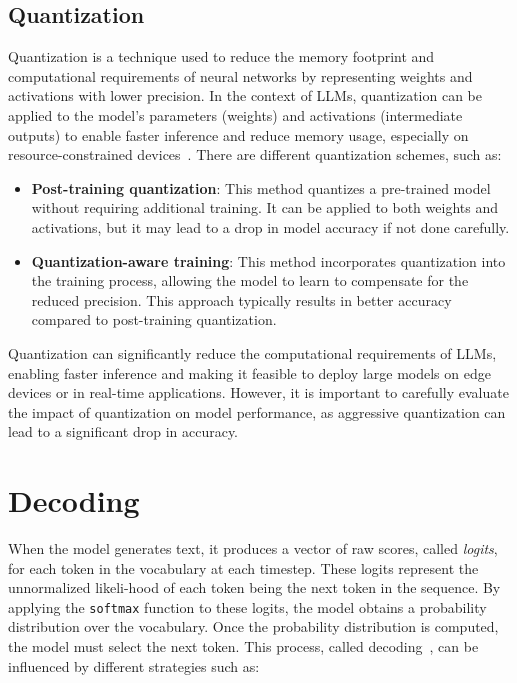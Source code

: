 \subsection{Quantization}
Quantization is a technique used to reduce the memory footprint and computational requirements of neural networks by representing weights and activations with lower precision.
In the context of \ac{LLM}s, quantization can be applied to the model's parameters (weights) and activations (intermediate outputs) to enable faster inference and reduce memory usage, especially on resource-constrained devices~\cite{site:WhatQuantization,site:huggingfaceQuantization}.
There are different quantization schemes, such as:
\begin{itemize}
    \item \textbf{Post-training quantization}: This method quantizes a pre-trained model without requiring additional training. It can be applied to both weights and activations, but it may lead to a drop in model accuracy if not done carefully.
    \item \textbf{Quantization-aware training}: This method incorporates quantization into the training process, allowing the model to learn to compensate for the reduced precision. This approach typically results in better accuracy compared to post-training quantization.    
    \end{itemize}
Quantization can significantly reduce the computational requirements of \ac{LLM}s, enabling faster inference and making it feasible to deploy large models on edge devices or in real-time applications. However, it is important to carefully evaluate the impact of quantization on model performance, as aggressive quantization can lead to a significant drop in accuracy.

\section{Decoding}
When the model generates text, it produces a vector of raw scores, called \emph{logits}, for each
token in the vocabulary at each timestep. These logits represent the unnormalized likeli-hood of each token being the next token in the sequence.
By applying the \texttt{softmax} function to these logits, the model obtains a probability distribution over the vocabulary.
Once the probability distribution is computed, the model must select the next token. 
This process, called decoding~\cite{site:ibmFoundationModel}, can be influenced by different strategies such as:

